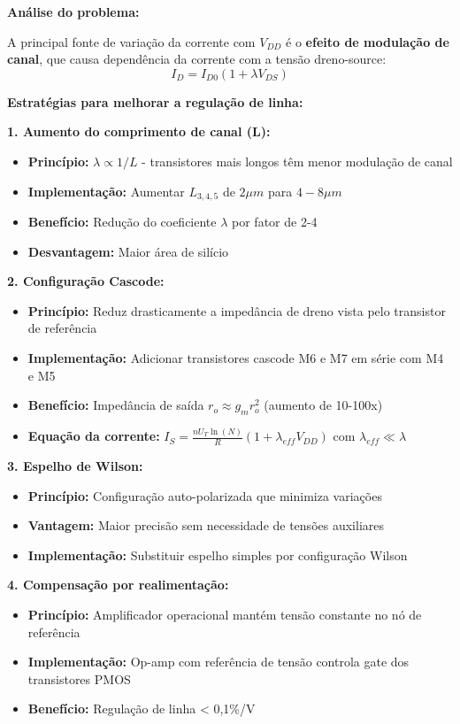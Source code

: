 ﻿\documentclass[12pt,a4paper]{article}
\begin{document}
\textbf{Análise do problema:}

A principal fonte de variação da corrente com $V_{DD}$ é o \textbf{efeito de modulação de canal}, que causa dependência da corrente com a tensão dreno-source:
$$I_D = I_{D0}(1 + \lambda V_{DS}) $$

\textbf{Estratégias para melhorar a regulação de linha:}

\textbf{1. Aumento do comprimento de canal (L):}
\begin{itemize}
    \item \textbf{Princípio:} $\lambda \propto 1/L$ - transistores mais longos têm menor modulação de canal
    \item \textbf{Implementação:} Aumentar $L_{3,4,5}$ de $2\mu m$ para $4-8\mu m$
    \item \textbf{Benefício:} Redução do coeficiente $\lambda$ por fator de 2-4
    \item \textbf{Desvantagem:} Maior área de silício
\end{itemize}

\textbf{2. Configuração Cascode:}
\begin{itemize}
    \item \textbf{Princípio:} Reduz drasticamente a impedância de dreno vista pelo transistor de referência
    \item \textbf{Implementação:} Adicionar transistores cascode M6 e M7 em série com M4 e M5
    \item \textbf{Benefício:} Impedância de saída $r_o \approx g_m r_o^2$ (aumento de 10-100x)
    \item \textbf{Equação da corrente:} $I_S = \frac{nU_T \ln(N)}{R}(1 + \lambda_{eff} V_{DD})$ com $\lambda_{eff} \ll \lambda$
\end{itemize}

\textbf{3. Espelho de Wilson:}
\begin{itemize}
    \item \textbf{Princípio:} Configuração auto-polarizada que minimiza variações
    \item \textbf{Vantagem:} Maior precisão sem necessidade de tensões auxiliares
    \item \textbf{Implementação:} Substituir espelho simples por configuração Wilson
\end{itemize}

\textbf{4. Compensação por realimentação:}
\begin{itemize}
    \item \textbf{Princípio:} Amplificador operacional mantém tensão constante no nó de referência
    \item \textbf{Implementação:} Op-amp com referência de tensão controla gate dos transistores PMOS
    \item \textbf{Benefício:} Regulação de linha < 0,1\%/V
\end{itemize}
\end{document}
